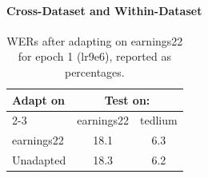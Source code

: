 \paragraph{Cross-Dataset and Within-Dataset}
\begin{table}[h!]
    \centering
    \begin{tabular}{lcc}
        \toprule
        \multirow{2}{*}{Adapt on} & \multicolumn{2}{c}{Test on:} \\
        \cmidrule(lr){2-3}
         & earnings22 & tedlium \\
        \midrule
        earnings22 & 18.1 & 6.3 \\
        \midrule
        Unadapted & 18.3 & 6.2 \\
        \bottomrule
    \end{tabular}
    \caption{WERs after adapting on earnings22 for epoch 1 (lr9e6), reported as percentages.}
    \label{tab:crossdataset:epoch1-lr9e6}
\end{table}
